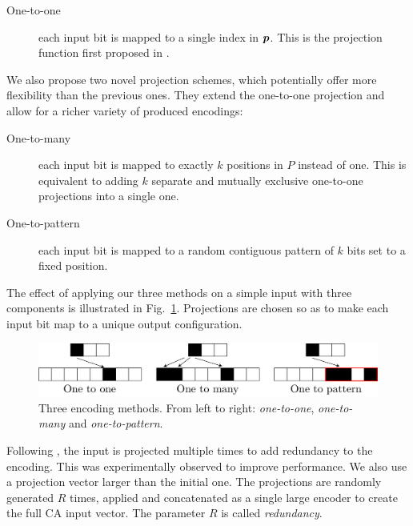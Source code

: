 \begin{description}
  \item[One-to-one] each input bit is mapped to a single index in ${\bm{p}}$.
        This is the projection function first proposed in
        \textcite{yilmazReservoirComputingUsing2014}.
\end{description}

We also propose two novel projection schemes, which potentially offer more
flexibility than the previous ones. They extend the one-to-one projection and
allow for a richer variety of produced encodings:

\begin{description}
  \item[One-to-many] each input bit is mapped to exactly $k$ positions in $P$
        instead of one. This is equivalent to adding $k$ separate and mutually
        exclusive one-to-one projections into a single one.
  \item[One-to-pattern] each input bit is mapped to a random contiguous pattern
        of $k$ bits set to a fixed position.
\end{description}

The effect of applying our three methods on a simple input with three components
is illustrated in Fig.~\ref{fig:enc_meth}. Projections are chosen so as to make
each input bit map to a unique output configuration.

\begin{figure}[htbp]
  \centering
  \includegraphics[width=\linewidth]{figures/encoding_methods.pdf}
  \caption{Three encoding methods. From left to right: \emph{one-to-one},
    \emph{one-to-many} and \emph{one-to-pattern}.}\label{fig:enc_meth}
\end{figure}

Following \parencite{yilmazReservoirComputingUsing2014,
  nicheleReservoirComputingUsing2017, nicheleDeepLearningCellular2017}, the
input is projected multiple times to add redundancy to the encoding. This was
experimentally observed to improve performance. We also use a projection vector
larger than the initial one. The projections are randomly generated $R$ times,
applied and concatenated as a single large encoder to create the full CA input
vector. The parameter $R$ is called \emph{redundancy}.

